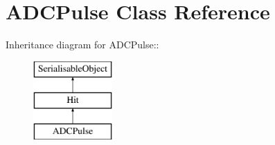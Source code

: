 \hypertarget{classADCPulse}{
\section{ADCPulse Class Reference}
\label{classADCPulse}
}
Inheritance diagram for ADCPulse::\begin{figure}[H]
\begin{center}
\leavevmode
\includegraphics[height=3cm]{classADCPulse}
\end{center}
\end{figure}
